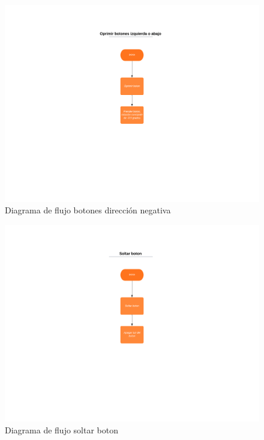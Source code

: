\documentclass[12pt]{article} %
\begin{document}
\begin{figure}  [!htb]
  \includegraphics[width=\linewidth]{flujo3.png}
  \caption{Diagrama de flujo botones dirección negativa}
\end{figure}

\begin{figure}  [!htb]
  \includegraphics[width=\linewidth]{flujo4.png}
  \caption{Diagrama de flujo soltar boton}
\end{figure}
\end{document}
